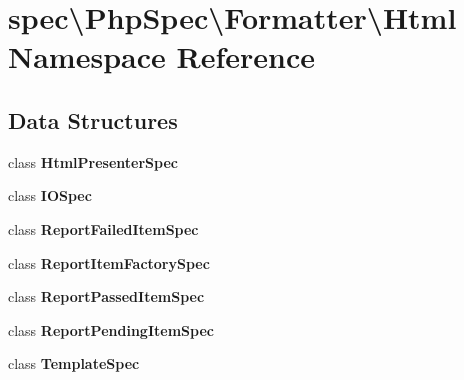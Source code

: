\section{spec\textbackslash{}Php\+Spec\textbackslash{}Formatter\textbackslash{}Html Namespace Reference}
\label{namespacespec_1_1_php_spec_1_1_formatter_1_1_html}
\subsection*{Data Structures}
\begin{DoxyCompactItemize}
\item 
class {\bf Html\+Presenter\+Spec}
\item 
class {\bf I\+O\+Spec}
\item 
class {\bf Report\+Failed\+Item\+Spec}
\item 
class {\bf Report\+Item\+Factory\+Spec}
\item 
class {\bf Report\+Passed\+Item\+Spec}
\item 
class {\bf Report\+Pending\+Item\+Spec}
\item 
class {\bf Template\+Spec}
\end{DoxyCompactItemize}
